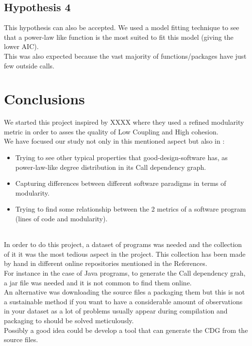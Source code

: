 \documentclass[12pt, a4paper]{article}
\begin{document}
\subsection{Hypothesis 4}

This hypothesis can also be accepted. We used a model fitting technique to see that a power-law like function is the most suited to fit this model (giving the lower AIC).  \\

This was also expected because the vast majority of functions/packages have just few outside calls.



\section{Conclusions}

We started this project inspired by XXXX where they used a refined modularity metric in order to asses the quality of Low Coupling and High cohesion. \\
We have focused our study not only in this mentioned aspect but also in :

\begin{itemize}
  \item Trying to see other typical properties that good-design-software has, as power-law-like degree distribution in its Call dependency graph.
  \item Capturing differences between different software paradigms in terms of modularity.
  \item Trying to find some relationship between the 2 metrics of a software program (lines of code and modularity).
\end{itemize}\\

In order to do this project, a dataset of programs was needed and the collection of it it was the most tedious aspect in the project. This collection has been made by hand in different online repositories mentioned in the References. \\
For instance in the case of Java programs, to generate the Call dependency grah, a jar file was needed and it is not common to find them online.\\ An alternative was downloading the source files a packaging them but this is not a sustainable method if you want to have a considerable amount of observations in your dataset as a lot of problems usually appear during compilation and packaging to should be solved meticulously. \\ Possibly a good idea could be develop a tool that can generate the CDG from the source files.
\end{document}
